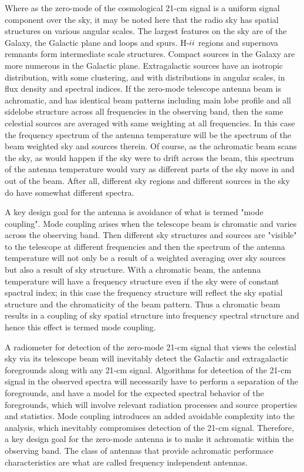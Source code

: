 \begin{itemize}
   Where as the zero-mode of the cosmological 21-cm signal is a uniform signal component over the sky, it may be noted here that the radio sky has spatial structures on various angular scales.  The largest features on the sky are of the Galaxy, the Galactic plane and loops and spurs.  H-${\sc ii}$ regions and supernova remnants form intermediate scale structures.  Compact sources in the Galaxy are more numerous in the Galactic plane. Extragalactic sources have an isotropic distribution, with some clustering, and with distributions in angular scales, in flux density and spectral indices.  If the zero-mode telescope antenna beam is achromatic, and has identical beam patterns including main lobe profile and all sidelobe structure across all frequencies in the observing band, then the same celestial sources are averaged with same weighting at all frequencies.  In this case the frequency spectrum of the antenna temperature will be the spectrum of the beam weighted sky and sources therein.  Of course, as the achromatic beam scans the sky, as would happen if the sky were to drift across the beam, this spectrum of the antenna temperature would vary as different parts of the sky move in and out of the beam.  After all, different sky regions and different sources in the sky do have somewhat different spectra.
   
   A key design goal for the antenna is avoidance of what is termed "mode coupling".  Mode coupling arises when the telescope beam is chromatic and varies across the observing band.  Then different sky structures and sources are "visible" to the telescope at different frequencies and then the spectrum of the antenna temperature will not only be a result of a weighted averaging over sky sources but also a result of sky structure.  With a chromatic beam, the antenna temperature will have a frequency structure even if the sky were of constant spactral index; in this case the frequency structure will reflect the sky spatial structure and the chromaticity of the beam pattern.  Thus a chromatic beam results in a coupling of sky spatial structure into frequency spectral structure and hence this effect is termed mode coupling.
   
   A radiometer for detection of the zero-mode 21-cm signal that views the celestial sky via its telescope beam will inevitably detect the Galactic and extragalactic foregrounds along with any 21-cm signal.  Algorithms for detection of the 21-cm signal in the observed spectra will necessarily have to perform a separation of the foregrounds, and have a model for the expected spectral behavior of the foregrounds, which will involve relevant radiation processes and source properties and statistics.  Mode coupling introduces an added avoidable complexity into the analysis, which inevitably compromises detection of the 21-cm signal.  Therefore, a key design goal for the zero-mode antenna is to make it achromatic within the observing band.  The class of antennas that provide achromatic performace characteristics are what are called frequency independent antennas.
   

\end{itemize}
